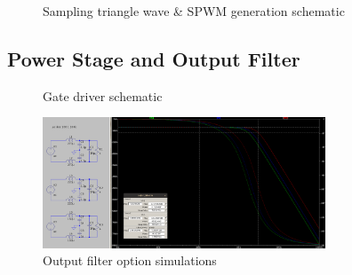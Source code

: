 \documentclass[11pt]{article}
\begin{document}
{\begin{figure}[h!]
  \centering
  \caption{Sampling triangle wave \& SPWM generation schematic}
\end{figure}

\subsection{Power Stage and Output Filter}

\begin{figure}[h!]
  \centering
  \caption{Gate driver schematic}
\end{figure}


\begin{figure}[h!]
  \centering
  \includegraphics[width=0.75\textwidth]{img/output_filter_sim.png}
  \caption{Output filter option simulations}
\end{figure}

}
\end{document}
